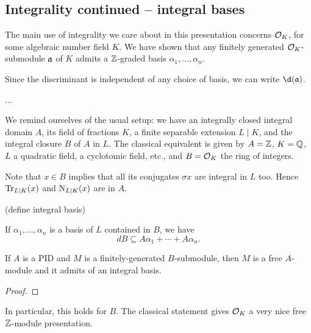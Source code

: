 \subsection{Integrality continued -- integral bases}


The main use of integrality we care about in this presentation concerns $\mathcal{O}_K$, for some algebraic number field $K$. We have shown that any finitely generated $\mathcal{O}_K$-submodule $\mathfrak{a}$ of $K$ admits a $\mathbb{Z}$-graded basis $\alpha_1,\dots,\alpha_n$.

Since the discriminant is independent of any choice of basis, we can write $\d(\fraka)$.

...

We remind ourselves of the usual setup: we have an integrally closed integral domain $A$, its field of fractions $K$, a finite separable extension $L\mid K$, and the integral closure $B$ of $A$ in $L$. The classical equivalent is given by $A=\mathbb{Z}$, $K=\mathbb{Q}$, $L$ a quadratic field, a cyclotomic field, etc., and $B=\mathcal{O}_K$ the ring of integers.

Note that $x\in B$ implies that all its conjugates $\sigma x$ are integral in $L$ too. Hence $\operatorname{Tr}_{L\mid K}(x)$ and $\operatorname{N}_{L\mid K}(x)$ are in $A$.

(define integral basis)

\begin{lemma}
	If $\alpha_1,\dots,\alpha_n$ is a basis of $L$ contained in $B$, we have
	\[
		dB\subseteq A\alpha_1 + \cdots + A\alpha_n.
	\]
\end{lemma}


\begin{proposition}
	If $A$ is a PID and $M$ is a finitely-generated $B$-submodule, then $M$ is a free $A$-module and it admits of an integral basis.
\end{proposition}
\begin{proof}
\end{proof}

In particular, this holds for $B$. The classical statement gives $\mathcal{O}_K$ a very nice free $\mathbb{Z}$-module presentation.
